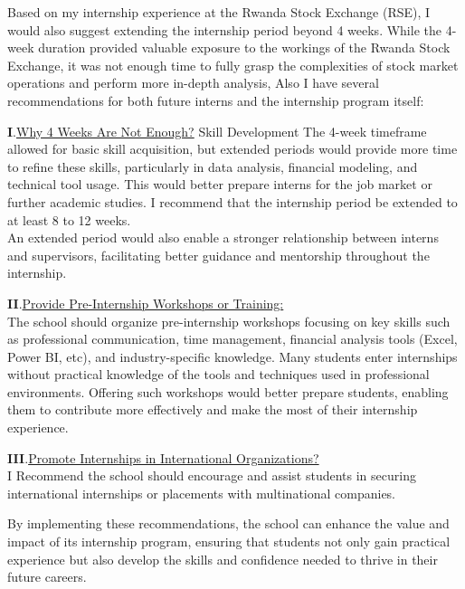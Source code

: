 \documentclass{article}
\begin{document}
\begin{titlepage}
\begin{titlepage}
\begin{flushleft}
\begin{flushleft}
Based on my internship experience at the Rwanda Stock Exchange (RSE), I would also suggest extending the internship period beyond 4 weeks. While the 4-week duration provided valuable exposure to the workings of the Rwanda Stock Exchange, it was not enough time to fully grasp the complexities of stock market operations and perform more in-depth analysis, Also I have several recommendations for both future interns and the internship program itself:
\vspace{0.2cm}

\textbf{I}.\underline{Why 4 Weeks Are Not Enough?} Skill Development The 4-week timeframe allowed for basic skill acquisition, but extended periods would provide more time to refine these skills, particularly in data analysis, financial modeling, and technical tool usage. This would better prepare interns for the job market or further academic studies. I recommend that the internship period be extended to at least 8 to 12 weeks.\\
An extended period would also enable a stronger relationship between interns and supervisors, facilitating better guidance and mentorship throughout the internship.
\vspace{0.2cm}

\textbf{II}.\underline{Provide Pre-Internship Workshops or Training:}\\
The school should organize pre-internship workshops focusing on key skills such as professional communication, time management, financial analysis tools (Excel, Power BI, etc), and industry-specific knowledge.
 Many students enter internships without practical knowledge of the tools and techniques used in professional environments. Offering such workshops would better prepare students, enabling them to contribute more effectively and make the most of their internship experience.
\vspace{0.2cm}

\textbf{III}.\underline{Promote Internships in International Organizations?}\\
I Recommend the school should encourage and assist students in securing international internships or placements with multinational companies.

 \vspace{0.2cm}

 By implementing these recommendations, the school can enhance the value and impact of its internship program, ensuring that students not only gain practical experience but also develop the skills and confidence needed to thrive in their future careers.
\vspace{1cm}


\end{flushleft}
\end{flushleft}
\end{titlepage}
\end{titlepage}
\end{document}
